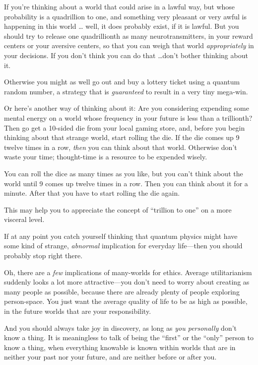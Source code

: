{
 If you're thinking about a world that could arise
in a lawful way, but whose probability is a quadrillion to one, and
something very pleasant or very awful is happening in this world \ldots
well, it does probably exist, if it is lawful. But you should try to
release one quadrillionth as many neurotransmitters, in your reward
centers or your aversive centers, so that you can weigh that world
\textit{appropriately} in your decisions. If you don't
think you can do that \ldots don't bother thinking about
it.}

{
 Otherwise you might as well go out and buy a lottery ticket using
a quantum random number, a strategy that is \textit{guaranteed} to
result in a very tiny mega-win.}

{
 Or here's another way of thinking about it: Are
you considering expending some mental energy on a world whose frequency
in your future is less than a trillionth? Then go get a 10-sided die
from your local gaming store, and, before you begin thinking about that
strange world, start rolling the die. If the die comes up 9 twelve
times in a row, \textit{then} you can think about that world. Otherwise
don't waste your time; thought-time is a resource to be
expended wisely.}

{
 You can roll the dice as many times as you like, but you
can't think about the world until 9 comes up twelve
times in a row. Then you can think about it for a minute. After that
you have to start rolling the die again.}

{
 This may help you to appreciate the concept of
``trillion to one'' on a more
visceral level.}

{
 If at any point you catch yourself thinking that quantum physics
might have some kind of strange, \textit{abnormal} implication for
everyday life---then you should probably stop right there.}

{
 Oh, there are a \textit{few} implications of many-worlds for
ethics. Average utilitarianism suddenly looks a lot more
attractive---you don't need to worry about creating as
many people as possible, because there are already plenty of people
exploring person-space. You just want the average quality of life to be
as high as possible, in the future worlds that are your
responsibility.}

{
 And you should always take joy in discovery, as long as
\textit{you personally} don't know a thing. It is
meaningless to talk of being the
``first'' or the
``only'' person to know a thing,
when everything knowable is known within worlds that are in neither
your past nor your future, and are neither before or after you.}

